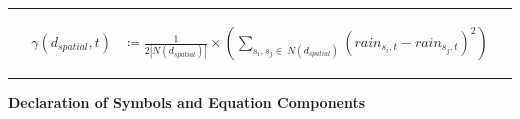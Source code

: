 \documentclass[
  12pt,
]{article}
\begin{document}
\rule{1\linewidth}{0.5pt}

\begin{equation}\label{eq:empirical_spatial_semivariogram_equation}
\begin{aligned}
\gamma(d_{spatial},t) &\coloneqq \frac{1}{2|N(d_{spatial})|}\times\left(\sum_{s_{i},s_{j}\in\:N(d_{spatial})}\left(rain_{s_{i},t} - rain_{s_{j},t}\right)^2\right)
\end{aligned}
\end{equation}

\citet{Cressie.2011} \textbar{} \citet{Wikle.2019}

\rule{1\linewidth}{0.5pt}

\vspace{0.5cm}

\begin{center}
\textbf{Declaration of Symbols and Equation Components}
\end{center}

\vspace{0.5cm}
\end{document}
